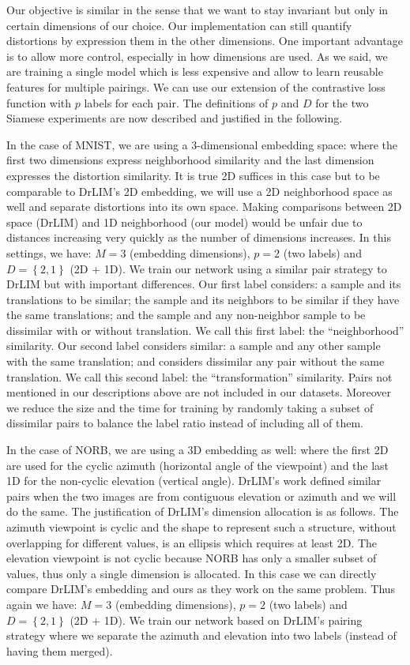 \documentclass[a4paper,12pt]{report}
\begin{document}
Our objective is similar in the sense that we want to stay invariant but only in certain dimensions of our choice.
Our implementation can still quantify distortions by expression them in the other dimensions.
One important advantage is to allow more control, especially in how dimensions are used.
As we said, we are training a single model which is less expensive and allow to learn reusable features for multiple pairings.
We can use our extension of the contrastive loss function with $p$ labels for each pair.
The definitions of $p$ and $D$ for the two Siamese experiments are now described and justified in the following.

In the case of MNIST, we are using a 3-dimensional embedding space: where the first two dimensions express neighborhood similarity and the last dimension expresses the distortion similarity.
It is true 2D suffices in this case but to be comparable to DrLIM's 2D embedding, we will use a 2D neighborhood space as well and separate distortions into its own space.
Making comparisons between 2D space (DrLIM) and 1D neighborhood (our model) would be unfair due to distances increasing very quickly as the number of dimensions increases.
In this settings, we have: $M=3$ (embedding dimensions), $p = 2$ (two labels) and $D = \left\{ 2, 1 \right\}$ (2D + 1D).
We train our network using a similar pair strategy to DrLIM but with important differences.
Our first label considers: a sample and its translations to be similar; the sample and its neighbors to be similar if they have the same translations; and the sample and any non-neighbor sample to be dissimilar with or without translation.
We call this first label: the ``neighborhood'' similarity.
Our second label considers similar: a sample and any other sample with the same translation; and considers dissimilar any pair without the same translation.
We call this second label: the ``transformation'' similarity.
Pairs not mentioned in our descriptions above are not included in our datasets.
Moreover we reduce the size and the time for training by randomly taking a subset of dissimilar pairs to balance the label ratio instead of including all of them.

In the case of NORB, we are using a 3D embedding as well: where the first 2D are used for the cyclic azimuth (horizontal angle of the viewpoint) and the last 1D for the non-cyclic elevation (vertical angle).
DrLIM's work defined similar pairs when the two images are from contiguous elevation or azimuth and we will do the same.
The justification of DrLIM's dimension allocation is as follows.
The azimuth viewpoint is cyclic and the shape to represent such a structure, without overlapping for different values, is an ellipsis which requires at least 2D.
The elevation viewpoint is not cyclic because NORB has only a smaller subset of values, thus only a single dimension is allocated.
In this case we can directly compare DrLIM's embedding and ours as they work on the same problem.
Thus again we have: $M=3$ (embedding dimensions), $p = 2$ (two labels) and $D = \left\{ 2, 1 \right\}$ (2D + 1D).
We train our network based on DrLIM's pairing strategy where we separate the azimuth and elevation into two labels (instead of having them merged).
\end{document}
